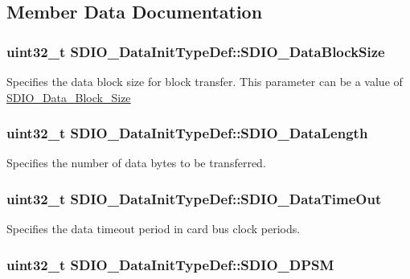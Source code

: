 \subsection{Member Data Documentation}
\hypertarget{structSDIO__DataInitTypeDef_a2252d17c4b3182830eb9f400489cb10f}{
\subsubsection[{SDIO\_\-DataBlockSize}]{\setlength{\rightskip}{0pt plus 5cm}uint32\_\-t {\bf SDIO\_\-DataInitTypeDef::SDIO\_\-DataBlockSize}}}
\label{structSDIO__DataInitTypeDef_a2252d17c4b3182830eb9f400489cb10f}
Specifies the data block size for block transfer. This parameter can be a value of \hyperlink{group__SDIO__Data__Block__Size}{SDIO\_\-Data\_\-Block\_\-Size} \hypertarget{structSDIO__DataInitTypeDef_ac325889a6dd582130a752aafc3ec9ee9}{
\subsubsection[{SDIO\_\-DataLength}]{\setlength{\rightskip}{0pt plus 5cm}uint32\_\-t {\bf SDIO\_\-DataInitTypeDef::SDIO\_\-DataLength}}}
\label{structSDIO__DataInitTypeDef_ac325889a6dd582130a752aafc3ec9ee9}
Specifies the number of data bytes to be transferred. \hypertarget{structSDIO__DataInitTypeDef_a6877ec1042a273e228114e5362b93aa1}{
\subsubsection[{SDIO\_\-DataTimeOut}]{\setlength{\rightskip}{0pt plus 5cm}uint32\_\-t {\bf SDIO\_\-DataInitTypeDef::SDIO\_\-DataTimeOut}}}
\label{structSDIO__DataInitTypeDef_a6877ec1042a273e228114e5362b93aa1}
Specifies the data timeout period in card bus clock periods. \hypertarget{structSDIO__DataInitTypeDef_ad5eb5f3c6fd9e5d4a6664c5cf57d6b03}{
\subsubsection[{SDIO\_\-DPSM}]{\setlength{\rightskip}{0pt plus 5cm}uint32\_\-t {\bf SDIO\_\-DataInitTypeDef::SDIO\_\-DPSM}}}
